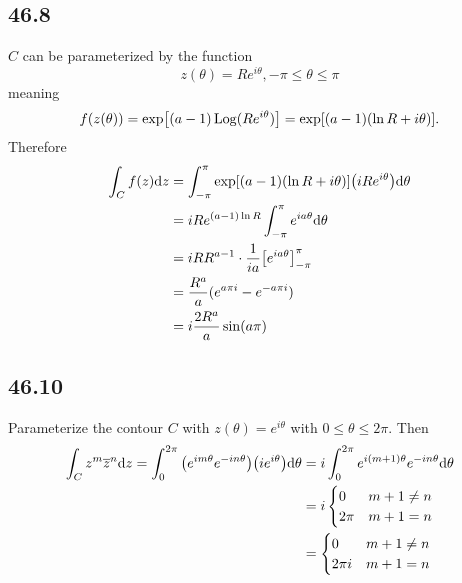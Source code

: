 \documentclass[12pt,titlepage]{extarticle}
\begin{document}
\subsection*{46.8}
$C$ can be parameterized by the function
\[
    z(\theta) = R e^{i \theta}, - \pi \leq \theta \leq \pi
\]
meaning
\[
    f(z(\theta)) = \exp[(a-1) \operatorname{Log}(R e^{i \theta})] = \exp[(a-1)(\ln R + i \theta)]
.\]
Therefore
\begin{align*}
    \int_C f(z) \dd z &= \int_{-\pi}^{\pi} \exp[(a-1)(\ln R + i \theta)] \qty(iR e^{i \theta}) \dd \theta \\
                      &= i R e^{(a-1) \ln R} \int_{-\pi}^\pi e^{i a \theta} \dd \theta \\
                      &= i R R^{a-1} \cdot \frac{1}{i a} \qty[e^{i a \theta}]_{-\pi}^{\pi} \\
                      &= \frac{R^a}{a} (e^{a \pi i} - e^{-a \pi i}) \\
                      &= i\frac{2R^a}{a} \sin(a \pi)
\end{align*}


\subsection*{46.10}
Parameterize the contour $C$ with $z(\theta) = e^{i \theta}$ with $0 \leq \theta \leq 2 \pi$. Then
\begin{align*}
    \int_C z^m \overline{z}^n \dd z = \int_0^{2 \pi} \qty(e^{im \theta} e^{-in \theta})\qty(ie^{i \theta}) \dd \theta &= i \int_0^{2 \pi} e^{i(m + 1)\theta} e^{-in \theta} \dd \theta \\
    &= i \begin{cases}
        0 & m + 1 \neq n \\
        2 \pi & m + 1 = n
    \end{cases} \\
    &= \begin{cases}
        0 & m + 1 \neq n \\
        2 \pi i & m + 1 = n
    \end{cases}
\end{align*}
\end{document}
